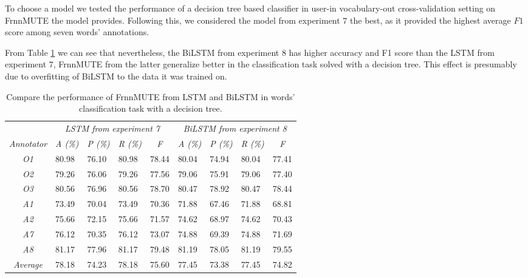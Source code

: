 To choose a model we tested the performance of a decision tree based classifier in user-in vocabulary-out cross-validation setting on FrnnMUTE the model provides. Following this, we considered the model from experiment $7$ the best, as it provided the highest average $F1$ score among seven words' annotations. 

From Table \ref{tab:compare-rnns} we can see that nevertheless, the BiLSTM from experiment $8$ has higher accuracy and F1 score than the LSTM from experiment $7$, FrnnMUTE from the latter generalize better in the classification task solved with a decision tree. This effect is presumably due to overfitting of BiLSTM to the data it was trained on. 


\begin{table}[h]
\begin{tabular}{c|llll|llll}
\hline
\textit{} & \multicolumn{4}{c|}{\textit{LSTM from experiment 7}} & \multicolumn{4}{c}{\textit{BiLSTM from experiment 8}} \\ \cline{2-9} 
\textit{Annotator} & \multicolumn{1}{c}{\textit{A (\%)}} & \multicolumn{1}{c}{\textit{P  (\%)}} & \multicolumn{1}{c}{\textit{R  (\%)}} & \multicolumn{1}{c|}{\textit{F}} & \multicolumn{1}{c}{\textit{A (\%)}} & \multicolumn{1}{c}{\textit{P  (\%)}} & \multicolumn{1}{c}{\textit{R  (\%)}} & \multicolumn{1}{c}{\textit{F}} \\ \hline
\textit{O1} & 80.98 & 76.10 & 80.98 & 78.44 & 80.04 & 74.94 & 80.04 & 77.41 \\
\textit{O2} & 79.26 & 76.06 & 79.26 & 77.56 & 79.06 & 75.91 & 79.06 & 77.40 \\
\textit{O3} & 80.56 & 76.96 & 80.56 & 78.70 & 80.47 & 78.92 & 80.47 & 78.44 \\
\textit{A1} & 73.49 & 70.04 & 73.49 & 70.36 & 71.88 & 67.46 & 71.88 & 68.81 \\
\textit{A2} & 75.66 & 72.15 & 75.66 & 71.57 & 74.62 & 68.97 & 74.62 & 70.43 \\
\textit{A7} & 76.12 & 70.35 & 76.12 & 73.07 & 74.88 & 69.39 & 74.88 & 71.69 \\
\textit{A8} & 81.17 & 77.96 & 81.17 & 79.48 & 81.19 & 78.05 & 81.19 & 79.55 \\ \hline
\textit{Average} & 78.18 & 74.23 & 78.18 & 75.60 & 77.45 & 73.38 & 77.45 & 74.82 \\ \hline
\end{tabular}
  \caption{Compare the performance of FrnnMUTE from LSTM and BiLSTM in words' classification task with a decision tree.}
  \label{tab:compare-rnns}
\end{table}
